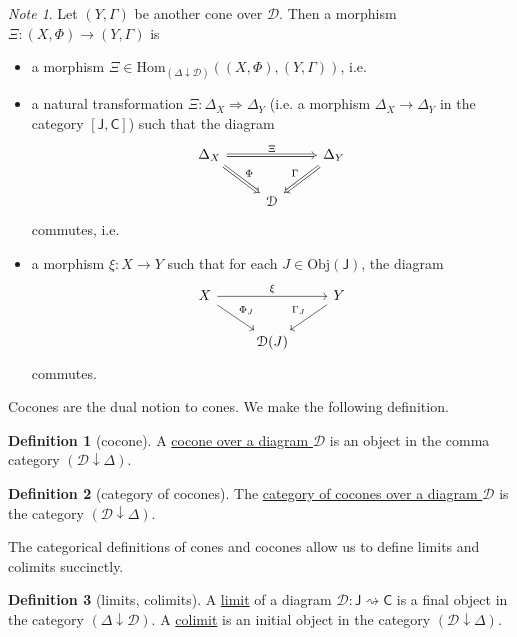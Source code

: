 \documentclass[a4paper]{report}
\newcommand{\defn}[1]{\ul{#1}}
\newcommand{\Obj}{\mathrm{Obj}}
\newcommand{\Hom}{\mathrm{Hom}}
\theoremstyle{definition}
\newtheorem{definition}{Definition}[section]
\theoremstyle{plain}
\theoremstyle{remark}
\newtheorem{note}{Note}[section]
\begin{document}
\begin{note}
  Let $(Y, \Gamma)$ be another cone over $\mathcal{D}$. Then a morphism $\Xi\colon (X, \Phi) \to (Y, \Gamma)$ is 
  \begin{itemize}
    \item a morphism $\Xi \in \Hom_{(\Delta \downarrow \mathcal{D})}((X, \Phi), (Y, \Gamma))$, i.e.
    \item a natural transformation $\Xi\colon \Delta_{X} \Rightarrow \Delta_{Y}$ (i.e. a morphism $\Delta_{X} \to \Delta_{Y}$ in the category $[\mathsf{J}, \mathsf{C}]$) such that the diagram
      \begin{equation*}
        \begin{tikzcd}
          \Delta_{X}
          \arrow[rr, Rightarrow, "\Xi"]
          \arrow[rd, Rightarrow, "\Phi"]
          & &  \Delta_{Y}
          \arrow[ld, swap, Rightarrow, "\Gamma"]
          \\
          & \mathcal{D}
        \end{tikzcd}
      \end{equation*}
      commutes, i.e.
    \item a morphism $\xi\colon X \to Y$ such that for each $J \in \Obj(\mathsf{J})$, the diagram
      \begin{equation*}
        \begin{tikzcd}
          X
          \arrow[rr, "\xi"]
          \arrow[rd, "\Phi_{J}"]
          & & Y
          \arrow[ld, swap, "\Gamma_{J}"]
          \\
          & \mathcal{D}(J)
        \end{tikzcd}
      \end{equation*}
      commutes.
  \end{itemize}
\end{note}

Cocones are the dual notion to cones. We make the following definition.
\begin{definition}[cocone]
  \label{def:cocone}
  A \defn{cocone over a diagram $\mathcal{D}$} is an object in the comma category $(\mathcal{D} \downarrow \Delta)$.
\end{definition}

\begin{definition}[category of cocones]
  \label{def:categoryofcocones}
  The \defn{category of cocones over a diagram $\mathcal{D}$} is the category $(\mathcal{D} \downarrow \Delta)$.
\end{definition}

The categorical definitions of cones and cocones allow us to define limits and colimits succinctly.
\begin{definition}[limits, colimits]
  \label{def:limitscolimits}
  A \defn{limit} of a diagram $\mathcal{D}\colon \mathsf{J} \rightsquigarrow \mathsf{C}$ is a final object in the category $(\Delta \downarrow \mathcal{D})$. A \defn{colimit} is an initial object in the category $(\mathcal{D} \downarrow \Delta)$.
\end{definition}
\end{document}
